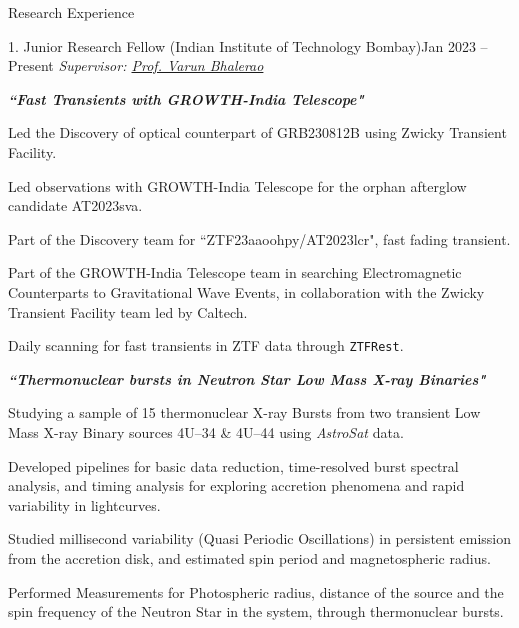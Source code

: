\begin{rSection}{Research Experience}
\hspace{-1.2em}\begin{rSubsection}{1. Junior Research Fellow (Indian Institute of Technology Bombay)}{Jan 2023 -- Present}{ \emph{Supervisor: \href{https://www.phy.iitb.ac.in/en/content/varun-bhalerao}{Prof. Varun Bhalerao}}}{}
\item[]  \hspace{-1em} \textbf{\textit{``Fast Transients with GROWTH-India Telescope"}}
\item Led the Discovery of optical counterpart of GRB230812B using Zwicky Transient Facility.
\item Led observations with GROWTH-India Telescope for the orphan afterglow candidate AT2023sva.
\item Part of the Discovery team for ``ZTF23aaoohpy/AT2023lcr", fast fading transient.
\item Part of the GROWTH-India Telescope team in searching Electromagnetic Counterparts to Gravitational Wave Events, in collaboration with the Zwicky Transient Facility team led by Caltech.
\item Daily scanning for fast transients in ZTF data through \texttt{ZTFRest}.
\newline
\item[]  \hspace{-1em} \textbf{\textit{``Thermonuclear bursts in Neutron Star Low Mass X-ray Binaries"}}
\item Studying a sample of 15 thermonuclear X-ray Bursts from two transient Low Mass X-ray Binary sources 4U--34 \& 4U--44 using \textit{AstroSat} data.
\item Developed pipelines for basic data reduction, time-resolved burst spectral analysis, and timing analysis for exploring accretion phenomena and rapid variability in lightcurves.
\item Studied millisecond variability (Quasi Periodic Oscillations) in persistent emission from the accretion disk, and estimated spin period and magnetospheric radius.
\item Performed Measurements for Photospheric radius, distance of the source and the spin frequency of the Neutron Star in the system, through thermonuclear bursts.

\end{rSubsection}

\vspace{0.1em}


\end{rSection}
